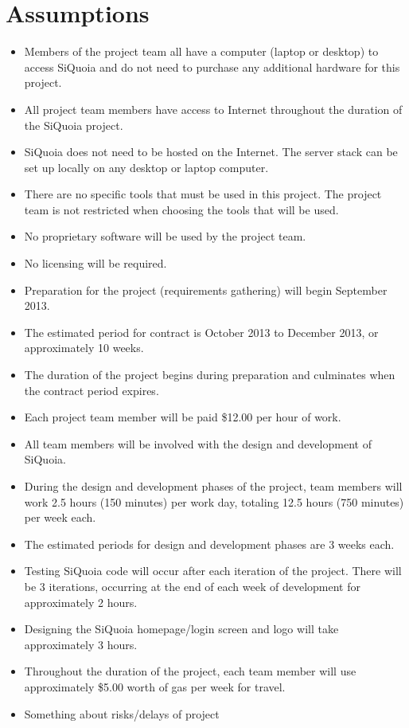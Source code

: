 \documentclass[12pt]{article}
\begin{document}
\section{Assumptions}
\begin{itemize}
\item Members of the project team all have a computer (laptop or
  desktop) to access SiQuoia and do not need to purchase any
  additional hardware for this project.
\item All project team members have access to Internet throughout
  the duration of the SiQuoia project.
\item SiQuoia does not need to be hosted on the Internet. The server 
  stack can be set up locally on any desktop or laptop computer.
\item There are no specific tools that must be used in this
  project. The project team is not restricted when choosing the tools
  that will be used.
\item No proprietary software will be used by the project team.
\item No licensing will be required.
\item Preparation for the project (requirements gathering) will begin
  September 2013.
\item The estimated period for contract is October 2013 to December
  2013, or approximately 10 weeks.
\item The duration of the project begins during preparation and
  culminates when the contract period expires.
\item Each project team member will be paid \$12.00 per hour of work.
\item All team members will be involved with the design and
  development of SiQuoia.
\item During the design and development phases of the project, team
  members will work 2.5 hours (150 minutes) per work day, totaling
  12.5 hours (750 minutes) per week each.
\item The estimated periods for design and development phases are 3
  weeks each.
\item Testing SiQuoia code will occur after each iteration of the
  project. There will be 3 iterations, occurring at the end of each
  week of development for approximately 2 hours.
\item Designing the SiQuoia homepage/login screen and logo will take
  approximately 3 hours.
\item Throughout the duration of the project, each team member will
  use approximately \$5.00 worth of gas per week for travel.
\item Something about risks/delays of project
\end{itemize}
\end{document}
